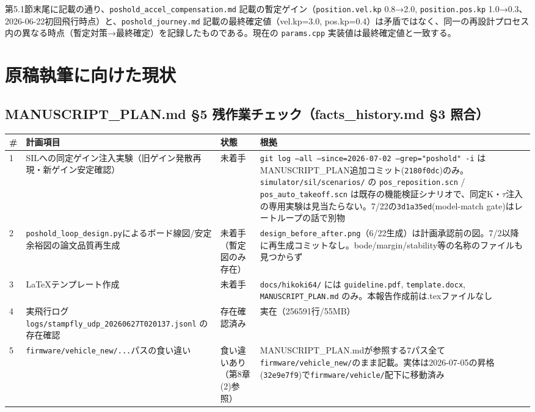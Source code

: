 \documentclass[a4paper,10pt]{ltjsarticle}
\begin{document}
第5.1節末尾に記載の通り、\texttt{poshold\_accel\_compensation.md} 記載の暫定ゲイン（\texttt{position.vel.kp} 0.8→2.0, \texttt{position.pos.kp} 1.0→0.3、2026-06-22初回飛行時点）と、\texttt{poshold\_journey.md} 記載の最終確定値（vel.kp=3.0, pos.kp=0.4）は矛盾ではなく、同一の再設計プロセス内の異なる時点（暫定対策→最終確定）を記録したものである。現在の \texttt{params.cpp} 実装値は最終確定値と一致する。

\section{原稿執筆に向けた現状}

\subsection{MANUSCRIPT\_PLAN.md §5 残作業チェック（facts\_history.md §3 照合）}

{\footnotesize
\begin{longtable}{@{}p{0.5cm}p{4.0cm}p{2.3cm}p{7.7cm}@{}}
\toprule
\# & 計画項目 & 状態 & 根拠 \\
\midrule
\endhead
1 & SILへの同定ゲイン注入実験（旧ゲイン発散再現・新ゲイン安定確認） & 未着手 & \texttt{git log --all --since=2026-07-02 --grep="poshold" -i} はMANUSCRIPT\_PLAN追加コミット(\texttt{2180f0dc})のみ。\texttt{simulator/sil/scenarios/} の \texttt{pos\_reposition.scn} / \texttt{pos\_auto\_takeoff.scn} は既存の機能検証シナリオで、同定K・$\tau$注入の専用実験は見当たらない。7/22の\texttt{3d1a35ed}(model-match gate)はレートループの話で別物 \\
2 & \texttt{poshold\_loop\_design.py}によるボード線図/安定余裕図の論文品質再生成 & 未着手（暫定図のみ存在） & \texttt{design\_before\_after.png}（6/22生成）は計画承認前の図。7/2以降に再生成コミットなし。bode/margin/stability等の名称のファイルも見つからず \\
3 & LaTeXテンプレート作成 & 未着手 & \texttt{docs/hikoki64/} には \texttt{guideline.pdf}, \texttt{template.docx}, \texttt{MANUSCRIPT\_PLAN.md} のみ。本報告作成前は.texファイルなし \\
4 & 実飛行ログ \newline\texttt{logs/stampfly\_udp\_\allowbreak20260627T020137.jsonl} の存在確認 & 存在確認済み & 実在（256591行/55MB） \\
5 & \texttt{firmware/vehicle\_new/...}パスの食い違い & 食い違いあり（第8章(2)参照） & MANUSCRIPT\_PLAN.mdが参照する7パス全て\texttt{firmware/vehicle\_new/}のまま記載。実体は2026-07-05の昇格(\texttt{32e9e7f9})で\texttt{firmware/vehicle/}配下に移動済み \\
\bottomrule
\end{longtable}
}
\end{document}
